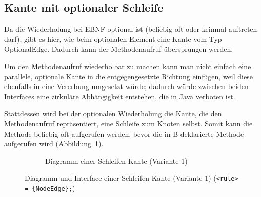 \documentclass[../InterneDSLs.tex]{subfiles}
\begin{document}
\subsection{Kante mit optionaler Schleife}\label{SEC:OptionalLoop}
Da die Wiederholung bei EBNF optional ist (beliebig oft oder keinmal auftreten darf), gibt es hier, wie beim optionalen Element eine Kante vom Typ OptionalEdge. Dadurch kann der Methodenaufruf übersprungen werden.

Um den Methodenaufruf wiederholbar zu machen kann man nicht einfach eine parallele, optionale Kante in die entgegengesetzte Richtung einfügen, weil diese ebenfalls in eine Vererbung umgesetzt würde; dadurch würde zwischen beiden Interfaces eine zirkuläre Abhängigkeit entstehen, die in Java verboten ist.

Stattdessen wird bei der optionalen Wiederholung die Kante, die den Methodenaufruf repräsentiert, eine Schleife zum Knoten selbst. Somit kann die Methode beliebig oft aufgerufen werden, bevor die in B deklarierte Methode aufgerufen wird (Abbildung~\ref{FIG:DiagramLoopNode}).
\begin{figure}[ht]
\centering
  \begin{subfigure}[c]{0.49\textwidth}
    \caption{Diagramm einer Schleifen-Kante (Variante 1)}
    \label{FIG:DiagramLoopNode}
  \end{subfigure}
  \begin{subfigure}[c]{0.49\textwidth}
    
  \end{subfigure}
  \caption{Diagramm und Interface einer Schleifen-Kante (Variante 1) (\texttt{<rule> = \{NodeEdge\};})}
  \label{FIG:LoopNode}
\end{figure}
\end{document}
